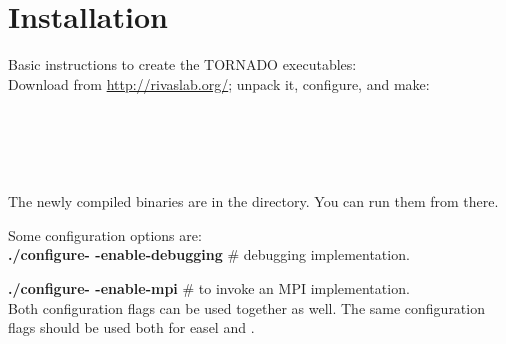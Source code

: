 \section{Installation}

Basic instructions to create the TORNADO executables:\\

Download  from \url{http://rivaslab.org/}; unpack
it, configure, and make:\\

\\
\\
\\ 
\\
\\

The newly compiled binaries  are in the
 directory. You can run them from there.

\noindent
Some configuration options are:\\

\textbf{./configure\quad  - -enable-debugging}\hspace{2mm} \# debugging implementation.

\textbf{./configure\quad  - -enable-mpi\hspace{15mm}}  \# to invoke an MPI implementation.\\


\noindent
Both configuration flags can be used together as well. The same
configuration flags should be used both for easel and \tornado.
